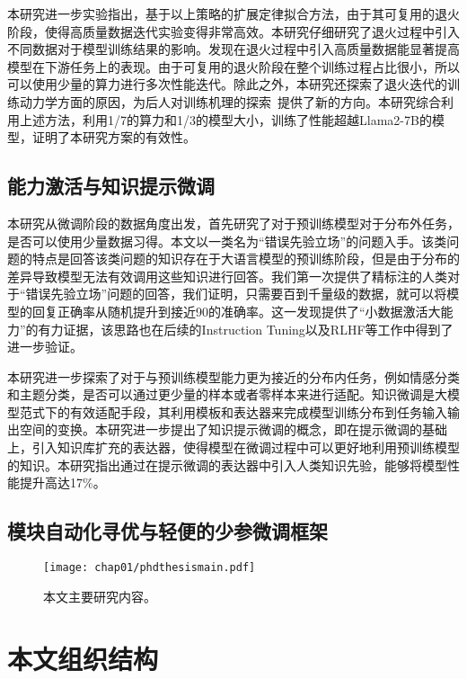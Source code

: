 本研究进一步实验指出，基于以上策略的扩展定律拟合方法，由于其可复用的退火阶段，使得高质量数据迭代实验变得非常高效。本研究仔细研究了退火过程中引入不同数据对于模型训练结果的影响。发现在退火过程中引入高质量数据能显著提高模型在下游任务上的表现。由于可复用的退火阶段在整个训练过程占比很小，所以可以使用少量的算力进行多次性能迭代。除此之外，本研究还探索了退火迭代的训练动力学方面的原因，为后人对训练机理的探索~\cite{}提供了新的方向。本研究综合利用上述方法，利用1/7的算力和1/3的模型大小，训练了性能超越Llama2-7B的模型，证明了本研究方案的有效性。

\subsection{能力激活与知识提示微调}
本研究从微调阶段的数据角度出发，首先研究了对于预训练模型对于分布外任务，是否可以使用少量数据习得。本文以一类名为“错误先验立场”的问题入手。该类问题的特点是回答该类问题的知识存在于大语言模型的预训练阶段，但是由于分布的差异导致模型无法有效调用这些知识进行回答。我们第一次提供了精标注的人类对于“错误先验立场”问题的回答，我们证明，只需要百到千量级的数据，就可以将模型的回复正确率从随机提升到接近90的准确率。这一发现提供了“小数据激活大能力”的有力证据，该思路也在后续的Instruction Tuning以及RLHF等工作中得到了进一步验证。

本研究进一步探索了对于与预训练模型能力更为接近的分布内任务，例如情感分类和主题分类，是否可以通过更少量的样本或者零样本来进行适配。知识微调是大模型范式下的有效适配手段，其利用模板和表达器来完成模型训练分布到任务输入输出空间的变换。本研究进一步提出了知识提示微调的概念，即在提示微调的基础上，引入知识库扩充的表达器，使得模型在微调过程中可以更好地利用预训练模型的知识。本研究指出通过在提示微调的表达器中引入人类知识先验，能够将模型性能提升高达17\%。

\subsection{模块自动化寻优与轻便的少参微调框架}




\begin{figure}
\centering
\texttt{[image: chap01/phdthesismain.pdf]}
\label{fig:mainframework}
\caption{本文主要研究内容。}
\end{figure}

\section{本文组织结构}


